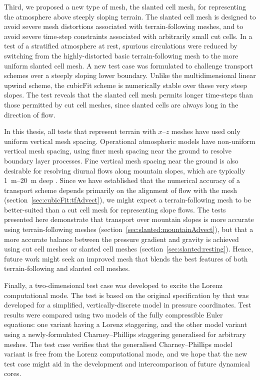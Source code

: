 Third, we proposed a new type of mesh, the slanted cell mesh, for representing the atmosphere above steeply sloping terrain.
The slanted cell mesh is designed to avoid severe mesh distortions associated with terrain-following meshes, and to avoid severe time-step constraints associated with arbitrarily small cut cells.
In a test of a stratified atmosphere at rest, spurious circulations were reduced by switching from the highly-distorted basic terrain-following mesh to the more uniform slanted cell mesh.
A new test case was formulated to challenge transport schemes over a steeply sloping lower boundary.
Unlike the multidimensional linear upwind scheme, the cubicFit scheme is numerically stable over these very steep slopes.
The test reveals that the slanted cell mesh permits longer time-steps than those permitted by cut cell meshes, since slanted cells are always long in the direction of flow.

In this thesis, all tests that represent terrain with $x$--$z$ meshes have used only uniform vertical mesh spacing.
Operational atmospheric models have non-uniform vertical mesh spacing, using finer mesh spacing near the ground to resolve boundary layer processes.
Fine vertical mesh spacing near the ground is also desirable for resolving diurnal flows along mountain slopes, which are typically \SIrange{1}{20}{\meter} deep \citep[p. 39]{chow2013}.
Since we have established that the numerical accuracy of a transport scheme depends primarily on the alignment of flow with the mesh (section~\ref{sec:cubicFit:tfAdvect}), we might expect a terrain-following mesh to be better-suited than a cut cell mesh for representing slope flows.
The tests presented here demonstrate that transport over mountain slopes is more accurate using terrain-following meshes (section~\ref{sec:slanted:mountainAdvect}), but that a more accurate balance between the pressure gradient and gravity is achieved using cut cell meshes or slanted cell meshes (section~\ref{sec:slanted:resting}).
Hence, future work might seek an improved mesh that blends the best features of both terrain-following and slanted cell meshes.

Finally, a two-dimensional test case was developed to excite the Lorenz computational mode.
The test is based on the original specification by \citet{arakawa-konor1996} that was developed for a simplified, vertically-discrete model in pressure coordinates.
Test results were compared using two models of the fully compressible Euler equations: one variant having a Lorenz staggering, and the other model variant using a newly-formulated Charney--Phillips staggering generalised for arbitrary meshes.
The test case verifies that the generalised Charney--Phillips model variant is free from the Lorenz computational mode, and we hope that the new test case might aid in the development and intercomparison of future dynamical cores.

